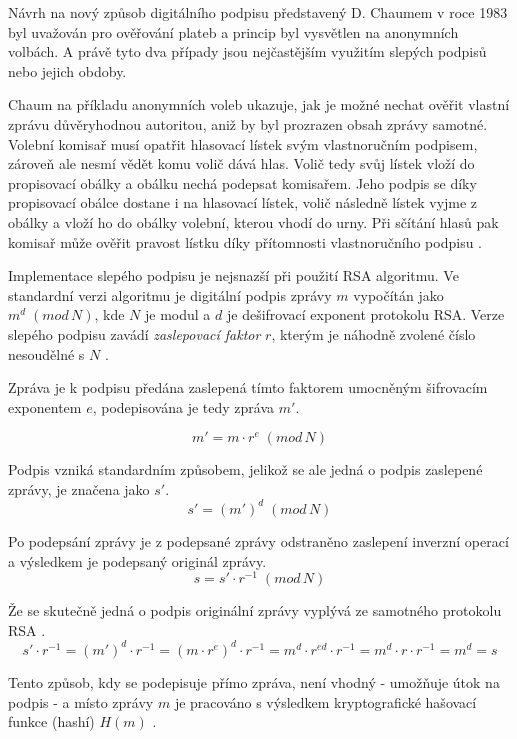 Návrh na nový způsob digitálního podpisu představený D. Chaumem v roce 1983 byl uvažován pro ověřování plateb a princip byl vysvětlen na anonymních volbách. A právě tyto dva případy jsou nejčastějším využitím slepých podpisů nebo jejich obdoby. 

Chaum na příkladu anonymních voleb ukazuje, jak je možné nechat ověřit vlastní zprávu důvěryhodnou autoritou, aniž by byl prozrazen obsah zprávy samotné.  Volební komisař musí opatřit hlasovací lístek svým vlastnoručním podpisem, zároveň ale nesmí vědět komu volič dává hlas. Volič tedy svůj lístek vloží do propisovací obálky a obálku nechá podepsat komisařem. Jeho podpis se díky propisovací obálce dostane i na hlasovací lístek, volič následně lístek vyjme z obálky a vloží ho do obálky volební, kterou vhodí do urny. Při sčítání hlasů pak komisař může ověřit pravost lístku díky přítomnosti vlastnoručního podpisu \cite{chaum}.

Implementace slepého podpisu je nejsnazší při použití RSA algoritmu. Ve standardní verzi algoritmu je digitální podpis zprávy $m$ vypočítán jako $m^d\;(mod\,N)$, kde $N$ je modul a $d$ je dešifrovací exponent protokolu RSA. Verze slepého podpisu zavádí \textit{zaslepovací faktor} $r$, kterým je náhodně zvolené číslo nesoudělné s $N$ \cite{chaum}.

Zpráva je k podpisu předána zaslepená tímto faktorem umocněným šifrovacím exponentem $e$, podepisována je tedy zpráva $m'$.

\[ m' = m \cdot r^e\;(mod\,N) \]

Podpis vzniká standardním způsobem, jelikož se ale jedná o podpis zaslepené zprávy, je značena jako $s'$.
\[ s' = (m')^d \; (mod\,N) \]

Po podepsání zprávy je z podepsané zprávy odstraněno zaslepení inverzní operací a výsledkem je podepsaný originál zprávy.
\[ s = s' \cdot r^{-1} \;(mod\,N) \]

Že se skutečně jedná o podpis originální zprávy vyplývá ze samotného protokolu RSA \cite{rsa}.
\[ s' \cdot r^{-1} = (m')^d \cdot r^{-1} = (m \cdot r^e)^d \cdot r^{-1} = 
	m^d \cdot r^{ed} \cdot r^{-1} = m^d \cdot r \cdot r^{-1} = m^d = s
\]

Tento způsob, kdy se podepisuje přímo zpráva, není vhodný - umožňuje útok na podpis - a místo zprávy $m$ je pracováno s výsledkem kryptografické hašovací funkce (hashí) $H(m)$ \cite{RsaAdventures}.